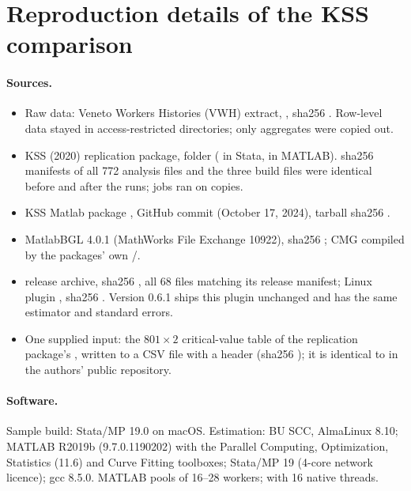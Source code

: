 \section{Reproduction details of the KSS comparison}\label{kss:app:repro}

\paragraph{Sources.}
\begin{itemize}
\item Raw data: Veneto Workers Histories (VWH) extract, , sha256 . Row-level data
stayed in access-restricted directories; only aggregates were copied out.
\item KSS (2020) replication package, folder  ( in Stata,  in
MATLAB). sha256 manifests of all 772 analysis files and the three build files were identical before and after
the runs; jobs ran on copies.
\item KSS Matlab package , GitHub commit  (October 17, 2024), tarball sha256
.
\item MatlabBGL 4.0.1 (MathWorks File Exchange 10922), sha256 ; CMG compiled by the
packages' own /.
\item \fevc{} release archive, sha256 , all 68 files matching its release manifest; Linux
plugin , sha256 . Version 0.6.1 ships this plugin unchanged
and has the same estimator and standard errors.
\item One supplied input: the $801\times2$ critical-value table  of the replication package's
, written to a CSV file with a header (sha256 ); it is identical
to  in the authors' public  repository.
\end{itemize}

\paragraph{Software.} Sample build: Stata/MP 19.0 on macOS. Estimation: BU SCC, AlmaLinux 8.10; MATLAB R2019b
(9.7.0.1190202) with the Parallel Computing, Optimization, Statistics (11.6) and Curve Fitting toolboxes; Stata/MP 19 (4-core
network licence); gcc 8.5.0. MATLAB pools of 16--28 workers; \fevc{} with 16 native threads.

